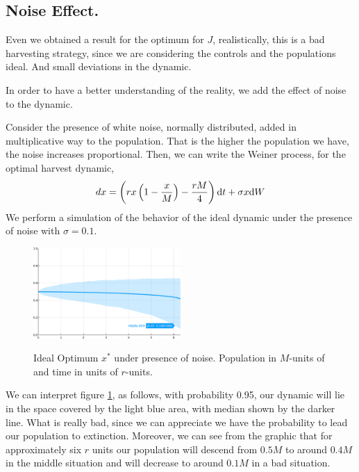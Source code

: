 \subsection{Noise Effect.}
Even we obtained a result for the optimum for $J$, realistically, this is a bad harvesting strategy, since we are considering the controls and the populations ideal. And small deviations in the dynamic.

In order to have a better understanding of the reality, we add the effect of noise to the dynamic.


Consider the presence of white noise, normally distributed, added in multiplicative way to the population. That is the higher the population we have, the noise increases proportional. Then, we can write the Weiner process, for the optimal harvest dynamic,
\begin{equation}
dx=\left(rx\left(1-\frac{x}{M}\right)-\frac{rM}{4}\right)\mathrm{d} t+\sigma x\mathrm{d} W \label{eq: Constant Harvesting Stochastic Control}
\end{equation}
We perform a simulation of the behavior of the ideal dynamic under the presence of noise with $\sigma=0.1$.

\begin{figure}[H]
	\caption{Ideal Optimum $x^*$ under presence of noise. Population in $M$-units of  and time in units of $r$-units.}
	\begin{center}
	\includegraphics[width=0.5\textwidth]{NoiseIdealDynamic.png}
	\label{fig: NoiseIdealConstant}
	\end{center}
\end{figure}

We can interpret figure \ref{fig: NoiseIdealConstant}, as follows, with probability 0.95, our dynamic will lie in the space covered by the light blue area, with median shown by the darker line. What is really bad, since we can appreciate we have the probability to lead our population to extinction. Moreover, we can see from the graphic that for approximately six $r$ units our population will descend from $0.5M$ to around $0.4M$ in the middle situation and will decrease to around $0.1M$ in a bad situation.


